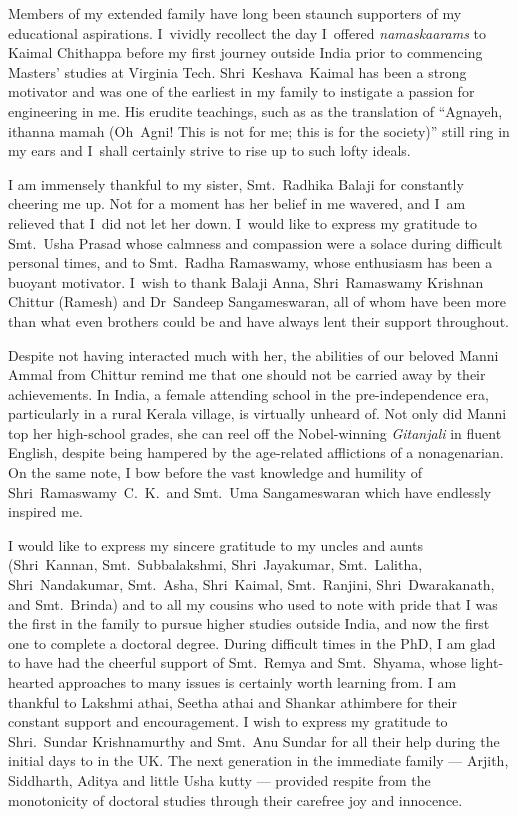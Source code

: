 Members of my extended family have long been staunch supporters of my
educational aspirations. I~vividly recollect the day I~offered
\emph{namaskaarams} to Kaimal Chithappa before my first journey outside India
prior to commencing Masters' studies at Virginia Tech. \mbox{Shri~Keshava
Kaimal} has been a strong motivator and was one of the earliest in my family to
instigate a passion for engineering in me. His erudite teachings, such as as the
translation of  \enquote{Agnayeh, ithanna mamah (Oh~Agni! This is not for me;
this is for the society)} still ring in my ears and I~shall certainly strive to
rise up to such lofty ideals.

I am immensely thankful to my sister, Smt.~Radhika Balaji for constantly
cheering me up. Not for a moment has her belief in me wavered, and I~am relieved
that I~did not let her down. I~would like to express my gratitude to Smt.~Usha
Prasad whose calmness and compassion were a solace during difficult personal
times, and to Smt.~Radha Ramaswamy, whose enthusiasm has been a  buoyant
motivator. I~wish to thank Balaji Anna, Shri~Ramaswamy Krishnan Chittur (Ramesh)
and Dr~Sandeep Sangameswaran, all of whom have been more than what even brothers
could be and have always lent their support throughout.


\addlines[1]

Despite not having interacted much with her, the abilities of our beloved Manni
Ammal from Chittur remind me that one should not be carried away by their
achievements. In India, a female attending school in the pre-independence era,
particularly in a rural Kerala village, is virtually unheard of. Not only did
Manni top her high-school grades, she can reel off the Nobel-winning
\emph{Gitanjali} in fluent English, despite being hampered by the age-related
afflictions of a nonagenarian. On the same note, I bow before the vast knowledge
and humility of Shri~Ramaswamy~C.~K.\ and Smt.~Uma Sangameswaran which have
endlessly inspired me.


I would like to express my sincere gratitude to my uncles and aunts
(Shri~Kannan, Smt.~Subbalakshmi, Shri~Jayakumar, Smt.~Lalitha,  Shri~Nandakumar,
Smt.~Asha, Shri~Kaimal, Smt.~Ranjini, Shri~Dwarakanath, and Smt.~Brinda) and to
all my cousins who used to note with pride that I was the first in the family to
pursue higher studies outside India, and now the first one to complete a
doctoral degree. During  difficult times in the PhD, I am glad to have had the
cheerful support of Smt.~Remya and Smt.~Shyama, whose light-hearted approaches
to many issues is certainly worth learning from. I am thankful to Lakshmi athai,
Seetha athai and Shankar athimbere for their constant support and encouragement.
I wish to express my gratitude to Shri.~Sundar Krishnamurthy and Smt.~Anu
Sundar for all their help during the initial days to in the UK.
The next generation in the immediate family --- Arjith, Siddharth, Aditya and
little Usha kutty --- provided respite from the monotonicity of doctoral studies
through their carefree joy and innocence.

